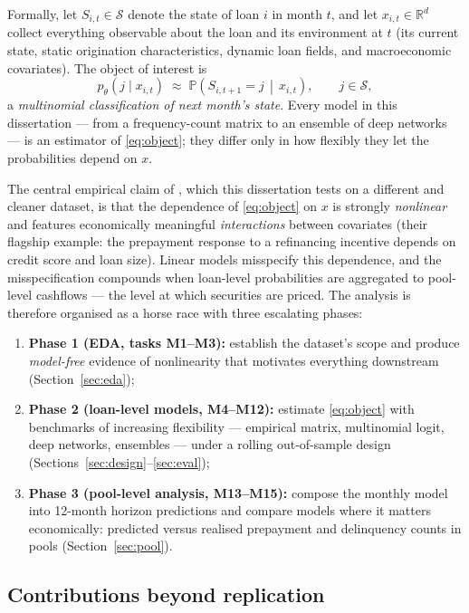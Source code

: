 \documentclass[11pt,a4paper]{article}
\newcommand{\Prob}{\mathbb{P}}
\newcommand{\R}{\mathbb{R}}
\begin{document}
Formally, let $S_{i,t}\in\mathcal{S}$ denote the state of loan $i$ in month $t$, and let $x_{i,t}\in\R^{d}$ collect everything observable about the loan and its environment at $t$ (its current state, static origination characteristics, dynamic loan fields, and macroeconomic covariates). The object of interest is
\begin{equation}
\label{eq:object}
p_\theta\!\left(j \mid x_{i,t}\right) \;\approx\; \Prob\!\left(S_{i,t+1}=j \,\middle|\, x_{i,t}\right), \qquad j\in\mathcal{S},
\end{equation}
a \emph{multinomial classification of next month's state}. Every model in this dissertation --- from a frequency-count matrix to an ensemble of deep networks --- is an estimator of \eqref{eq:object}; they differ only in how flexibly they let the probabilities depend on $x$.

The central empirical claim of \citet{sirignano2021}, which this dissertation tests on a different and cleaner dataset, is that the dependence of \eqref{eq:object} on $x$ is strongly \emph{nonlinear} and features economically meaningful \emph{interactions} between covariates (their flagship example: the prepayment response to a refinancing incentive depends on credit score and loan size). Linear models misspecify this dependence, and the misspecification compounds when loan-level probabilities are aggregated to pool-level cashflows --- the level at which securities are priced. The analysis is therefore organised as a horse race with three escalating phases:
\begin{enumerate}[itemsep=1pt]
  \item \textbf{Phase 1 (EDA, tasks M1--M3):} establish the dataset's scope and produce \emph{model-free} evidence of nonlinearity that motivates everything downstream (Section~\ref{sec:eda});
  \item \textbf{Phase 2 (loan-level models, M4--M12):} estimate \eqref{eq:object} with benchmarks of increasing flexibility --- empirical matrix, multinomial logit, deep networks, ensembles --- under a rolling out-of-sample design (Sections~\ref{sec:design}--\ref{sec:eval});
  \item \textbf{Phase 3 (pool-level analysis, M13--M15):} compose the monthly model into 12-month horizon predictions and compare models where it matters economically: predicted versus realised prepayment and delinquency counts in pools (Section~\ref{sec:pool}).
\end{enumerate}

\subsection{Contributions beyond replication}\label{sec:contributions}
\end{document}
